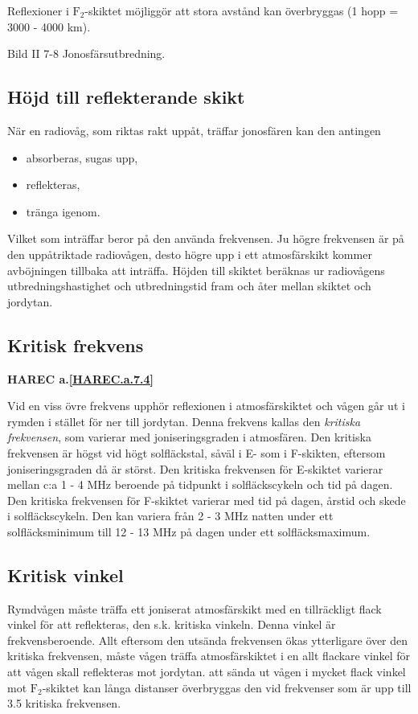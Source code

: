 Reflexioner i \(\mathrm{F_2}\)-skiktet möjliggör att stora
avstånd kan överbryggas (1 hopp = 3000 - 4000 km).

Bild II 7-8 Jonosfärsutbredning.

\subsection{Höjd till reflekterande skikt}

När en radiovåg, som riktas rakt uppåt, träffar jonosfären kan den antingen
\begin{itemize}
\item absorberas, sugas upp,
\item reflekteras,
\item tränga igenom.
\end{itemize}

Vilket som inträffar beror på den använda frekvensen. Ju högre
frekvensen är på den uppåtriktade radiovågen, desto högre upp i ett
atmosfärskikt kommer avböjningen tillbaka att inträffa. Höjden till
skiktet beräknas ur radiovågens utbredningshastighet och
utbredningstid fram och åter mellan skiktet och jordytan.

\subsection{Kritisk frekvens}
\textbf{
HAREC a.\ref{HAREC.a.7.4}\label{myHAREC.a.7.4}
}

Vid en viss övre frekvens upphör reflexionen i atmosfärskiktet och
vågen går ut i rymden i stället för ner till jordytan. Denna frekvens
kallas den \emph{kritiska frekvensen}, som varierar med
joniseringsgraden i atmosfären. Den kritiska frekvensen är högst vid
högt solfläckstal, såväl i E- som i F-skikten, eftersom
joniseringsgraden då är störst. Den kritiska frekvensen för E-skiktet
varierar mellan c:a 1 - 4 MHz beroende på tidpunkt i solfläckscykeln
och tid på dagen. Den kritiska frekvensen för F-skiktet varierar med
tid på dagen, årstid och skede i solfläckscykeln.  Den kan variera
från 2 - 3 MHz natten under ett solfläcksminimum till 12 - 13 MHz på
dagen under ett solfläcksmaximum.

\subsection{Kritisk vinkel}

Rymdvågen måste träffa ett joniserat atmosfärskikt med en tillräckligt
flack vinkel för att reflekteras, den s.k. kritiska vinkeln. Denna
vinkel är frekvensberoende. Allt eftersom den utsända frekvensen ökas
ytterligare över den kritiska frekvensen, måste vågen träffa
atmosfärskiktet i en allt flackare vinkel för att vågen skall
reflekteras mot jordytan.  att sända ut vågen i mycket flack vinkel
mot \(\mathrm{F_2}\)-skiktet kan långa distanser överbryggas den vid
frekvenser som är upp till 3.5 kritiska frekvensen.

